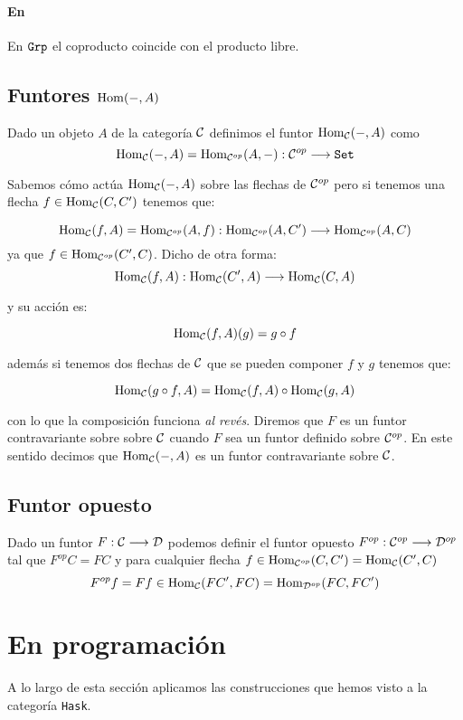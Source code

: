 \paragraph{En \Grp}
En $\texttt{Grp} $ el coproducto coincide con el producto libre.

\subsection{Funtores $\operatorname{Hom}(-, A)$}
Dado un objeto $A$ de la categoría $\mathcal{C}$ definimos el funtor
$\operatorname{Hom}_{\mathcal{C}}(-, A)$ como
$$\operatorname{Hom}_{\mathcal{C}}(-, A) = \operatorname{Hom}_{\mathcal{C}^{op}}(A, -) : \mathcal{C}^{op}\longrightarrow \texttt{Set}$$

Sabemos cómo actúa $\operatorname{Hom}_{\mathcal{C}}(-, A)$ sobre las flechas de $\mathcal{C}^{op}$
pero si tenemos una flecha $f \in \operatorname{Hom}_{\mathcal{C}}(C, C')$ tenemos que:

$$\operatorname{Hom}_{\mathcal{C}}(f, A) = \operatorname{Hom}_{\mathcal{C}^{op}}(A, f) :
  \operatorname{Hom}_{\mathcal{C}^{op}}(A, C')\longrightarrow \operatorname{Hom}_{\mathcal{C}^{op}}(A, C)$$
ya que $f \in \operatorname{Hom}_{\mathcal{C}^{op}}(C', C)$. Dicho de otra forma:
$$\operatorname{Hom}_{\mathcal{C}}(f, A) : \operatorname{Hom}_{\mathcal{C}}(C', A)\longrightarrow \operatorname{Hom}_{\mathcal{C}}(C, A)$$

y su acción es:

$$\operatorname{Hom}_{\mathcal{C}}(f, A)(g) = g\circ f$$

además si tenemos dos flechas de $\mathcal{C}$ que se pueden componer
$f$ y $g$ tenemos que:

$$\operatorname{Hom}_{\mathcal{C}}(g \circ f, A) = \operatorname{Hom}_{\mathcal{C}}(f, A) \circ \operatorname{Hom}_{\mathcal{C}}(g, A)$$

con lo que la composición funciona \textit{al revés}. Diremos que
$F$ es un funtor contravariante sobre sobre $\mathcal{C}$ cuando $F$ sea
un funtor definido sobre $\mathcal{C}^{op}$. En este sentido
decimos que $\operatorname{Hom}_{\mathcal{C}}(-, A)$ es un funtor contravariante
sobre $\mathcal{C}$.

\subsection{Funtor opuesto}
Dado un funtor $F : \mathcal{C}\longrightarrow \mathcal{D}$ podemos definir el funtor opuesto
$F^{op} : \mathcal{C}^{op}\longrightarrow \mathcal{D}^{op}$ tal que $F^{op}C = FC$ y para cualquier
flecha $f \in \operatorname{Hom}_{\mathcal{C}^{op}}(C, C') = \operatorname{Hom}_{\mathcal{C}}(C', C)$
$$F^{op}f = F f \in \operatorname{Hom}_{\mathcal{C}}(FC', FC) = \operatorname{Hom}_{\mathcal{D}^{op}}(FC, FC')$$

\section{En programación}
A lo largo de esta sección aplicamos las construcciones que hemos visto
a la categoría \texttt{Hask}.

